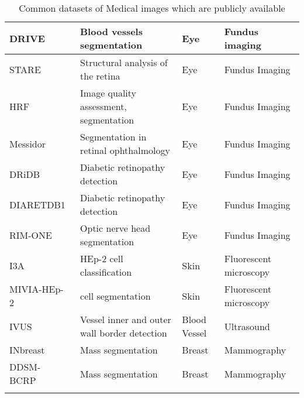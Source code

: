 \begin{longtable}{|>{\arraybackslash}p{5cm}|>{\arraybackslash}p{6cm}|>{\arraybackslash}p{1.7cm}|>{\arraybackslash}p{2.3cm}|}
	DRIVE~\cite{staal2004ridge} & Blood vessels segmentation & Eye & Fundus imaging \\ \hline 
	
	STARE~\cite{hoover2003locating} & Structural analysis of the retina & Eye & Fundus Imaging \\ \hline 
	
	HRF~\cite{budai2013robust} & Image quality assessment, segmentation & Eye & Fundus Imaging \\ \hline 
	
	Messidor~\cite{decenciere2014feedback} & Segmentation in retinal ophthalmology & Eye & Fundus Imaging \\ \hline 
	
	DRiDB~\cite{prentavsic2013diabetic} & Diabetic retinopathy detection & Eye & Fundus Imaging \\ \hline 
	
	DIARETDB1~\cite{kalviainen2007diaretdb1} & Diabetic retinopathy detection & Eye & Fundus Imaging \\ \hline 
	
	RIM-ONE~\cite{fumero2011rim} & Optic nerve head segmentation & Eye  & Fundus Imaging \\ \hline 
	
	I3A~\cite{hobson2015benchmarking} & HEp-2 cell classification & Skin & Fluorescent microscopy \\ \hline 
	
	MIVIA-HEp-2~\cite{hobson2016hep} & cell segmentation & Skin & Fluorescent microscopy \\ \hline 
	
	IVUS~\cite{balocco2014standardized} & Vessel inner and outer wall border detection & Blood Vessel & Ultrasound \\ \hline 
	
	INbreast~\cite{moreira2012inbreast} & Mass segmentation & Breast & Mammography \\ \hline 
	
	DDSM-BCRP~\cite{heath1998current} & Mass segmentation & Breast & Mammography \\ \hline
	\caption{Common datasets of Medical images which are publicly available }
	\label{datasets}
\end{longtable}
\newpage
